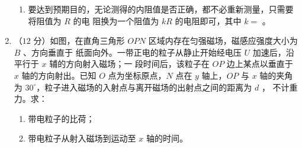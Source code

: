 \begin{enumerate}
\begin{enumerate}
\item 
要达到预期目的，无论测得的内阻值是否正确，都不必重新测量，只需要将阻值为 $ R $ 的电
阻换为一个阻值为 $ kR $ 的电阻即可，其中 $ k= $ \underlinegap 。

\end{enumerate}




\newpage
\item 
（$ 12 $ 分）如图，在直角三角形 $ OPN $ 区域内存在匀强磁场，磁感应强度大小为 $ B $ 、方向垂直于
纸面向外。一带正电的粒子从静止开始经电压 $ U $ 加速后，沿平行于 $ x $ 辅的方向射入磁场；一
段时间后，该粒子在 $ OP $ 边上某点以垂直于 $ x $ 轴的方向射出。已知 $ O $ 点为坐标原点，$ N $ 点在 $ y $
轴上，$ OP $ 与 $ x $ 轴的夹角为 $ 30 ^{ \circ } $，粒子进入磁场的入射点与离开磁场的出射点之间的距离为 $ d $ ，
不计重力。求：



\begin{enumerate}
\renewcommand{\labelenumi}{\arabic{enumi}.}
\item
带电粒子的比荷；



\item 
带电粒子从射入磁场到运动至 $ x $ 轴的时间。




\end{enumerate}
\begin{figure}[h!]
\flushright

\end{figure}

\end{enumerate}
